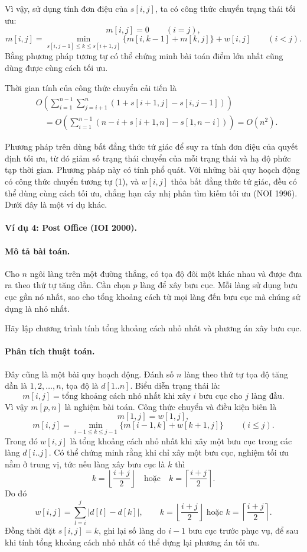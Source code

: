 \documentclass[11pt]{article}
\begin{document}
Vì vậy, sử dụng tính đơn điệu của \(s[i,j]\), ta có công thức chuyển trạng
thái tối ưu:
\[
  m[i,j]=0\qquad (i=j),
\]
\[
  m[i,j]=
  \min_{s[i,j-1]\le k\le s[i+1,j]}
  \{m[i,k-1]+m[k,j]\}+w[i,j]\qquad (i<j).
\]
Bằng phương pháp tương tự có thể chứng minh bài toán điểm lớn nhất cũng dùng
được cùng cách tối ưu.

Thời gian tính của công thức chuyển cải tiến là
\[
\begin{aligned}
&O\left(\sum_{i=1}^{n-1}\sum_{j=i+1}^{n}
  (1+s[i+1,j]-s[i,j-1])\right)\\
&\quad =
O\left(\sum_{i=1}^{n-1}
  (n-i+s[i+1,n]-s[1,n-i])\right)
=O(n^2).
\end{aligned}
\]

Phương pháp trên dùng bất đẳng thức tứ giác để suy ra tính đơn điệu của quyết
định tối ưu, từ đó giảm số trạng thái chuyển của mỗi trạng thái và hạ độ phức
tạp thời gian. Phương pháp này có tính phổ quát. Với những bài quy hoạch động
có công thức chuyển tương tự (1), và \(w[i,j]\) thỏa bất đẳng thức tứ giác,
đều có thể dùng cùng cách tối ưu, chẳng hạn cây nhị phân tìm kiếm tối ưu
(NOI 1996). Dưới đây là một ví dụ khác.

\paragraph{Ví dụ 4: Post Office (IOI 2000).}

\paragraph{Mô tả bài toán.}
Cho \(n\) ngôi làng trên một đường thẳng, có tọa độ đôi một khác nhau và được
đưa ra theo thứ tự tăng dần. Cần chọn \(p\) làng để xây bưu cục. Mỗi làng sử
dụng bưu cục gần nó nhất, sao cho tổng khoảng cách từ mọi làng đến bưu cục
mà chúng sử dụng là nhỏ nhất.

Hãy lập chương trình tính tổng khoảng cách nhỏ nhất và phương án xây bưu cục.

\paragraph{Phân tích thuật toán.}
Đây cũng là một bài quy hoạch động. Đánh số \(n\) làng theo thứ tự tọa độ
tăng dần là \(1,2,\ldots,n\), tọa độ là \(d[1..n]\). Biểu diễn trạng thái là:
\[
  m[i,j]=\text{tổng khoảng cách nhỏ nhất khi xây } i
  \text{ bưu cục cho } j \text{ làng đầu}.
\]
Vì vậy \(m[p,n]\) là nghiệm bài toán. Công thức chuyển và điều kiện biên là
\[
  m[1,j]=w[1,j],
\]
\[
  m[i,j]=\min_{i-1\le k\le j-1}
  \{m[i-1,k]+w[k+1,j]\}\qquad (i\le j).
\]
Trong đó \(w[i,j]\) là tổng khoảng cách nhỏ nhất khi xây một bưu cục trong
các làng \(d[i..j]\). Có thể chứng minh rằng khi chỉ xây một bưu cục, nghiệm
tối ưu nằm ở trung vị, tức nếu làng xây bưu cục là \(k\) thì
\[
  k=\left\lfloor\frac{i+j}{2}\right\rfloor
  \quad\text{hoặc}\quad
  k=\left\lceil\frac{i+j}{2}\right\rceil.
\]
Do đó
\[
  w[i,j]=\sum_{l=i}^{j}|d[l]-d[k]|,\qquad
  k=\left\lfloor\frac{i+j}{2}\right\rfloor
  \text{ hoặc }
  k=\left\lceil\frac{i+j}{2}\right\rceil.
\]
Đồng thời đặt \(s[i,j]=k\), ghi lại số làng do \(i-1\) bưu cục trước phục vụ,
để sau khi tính tổng khoảng cách nhỏ nhất có thể dựng lại phương án tối ưu.
\end{document}
